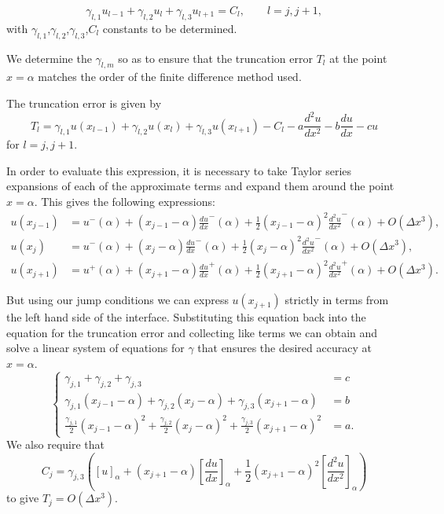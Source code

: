 \begin{equation} \label{eq:gammaCoefficients}
    \gamma_{l,1}u_{l-1} + \gamma_{l,2}u_l + \gamma_{l,3}u_{l+1} = C_l, \qquad l = j, j+1,
\end{equation}
with $\gamma_{l,1}$,$\gamma_{l,2}$,$\gamma_{l,3}$,$C_l$ constants to be determined.

We determine the $\gamma_{l,m}$ so as to ensure that the truncation error $T_l$ at the point $x = \alpha$ matches the order of the finite difference method used.

The truncation error is given by
\begin{equation} \label{eq:truncationError}
    T_l= \gamma_{l,1}u(x_{l-1}) + \gamma_{l,2}u(x_l) + \gamma_{l,3}u(x_{l+1}) - C_l - a\frac{d^2u}{dx^2} - b\frac{du}{dx} - cu
\end{equation}
for $l = j, j+1$.

In order to evaluate this expression, it is necessary to take Taylor series expansions of each of the approximate terms and expand them around the point $x = \alpha$. This gives the following expressions:
\begin{equation} \label{eq:taylorExpansions}
\begin{split}
    u(x_{j-1}) &  =  u^-(\alpha) + (x_{j-1} - \alpha)\frac{du}{dx}^-(\alpha) + \frac{1}{2}(x_{j-1} - \alpha)^2\frac{d^2u}{dx^2}^-(\alpha) + O(\Delta x^3), \\
    u(x_{j}) & =  u^-(\alpha) + (x_{j} - \alpha)\frac{du}{dx}^-(\alpha) + \frac{1}{2}(x_{j}-\alpha)^2\frac{d^2u}{dx^2}^-(\alpha) + O(\Delta x^3), \\
    u(x_{j+1}) & =  u^+(\alpha) + (x_{j+1} - \alpha)\frac{du}{dx}^+(\alpha) + \frac{1}{2}(x_{j+1}-\alpha)^2\frac{d^2u}{dx^2}^+(\alpha) + O(\Delta x^3).
\end{split}
\end{equation}


But using our jump conditions we can express $u(x_{j+1})$ strictly in terms from the left hand side of the interface.
Substituting this equation back into the equation for the truncation error and collecting like terms we can obtain and solve a linear system of equations for $\gamma$ that ensures the desired accuracy at $x=\alpha$.
\begin{equation}
    \left\{ \begin{aligned}
        \gamma_{j,1} + \gamma_{j,2} + \gamma_{j,3} & = c \\
        \gamma_{j,1}(x_{j-1}-\alpha) + \gamma_{j,2}(x_j - \alpha) + \gamma_{j,3}(x_{j+1} - \alpha) & = b \\
        \frac{\gamma_{j,1}}{2}(x_{j-1}-\alpha)^2 + \frac{\gamma_{j,2}}{2}(x_j - \alpha)^2 + \frac{\gamma_{j,3}}{2}(x_{j+1} - \alpha)^2 & = a.
    \end{aligned} \right. 
\end{equation}
We also require that 
\begin{equation}
    C_j = \gamma_{j,3}\left([u]_\alpha + (x_{j+1} - \alpha)\left[\frac{du}{dx}\right]_\alpha + \frac{1}{2}(x_{j+1} - \alpha)^2\left[\frac{d^2u}{dx^2}\right]_\alpha\right)
\end{equation}
to give $T_j = O(\Delta x^3)$.

